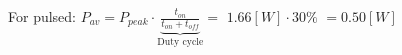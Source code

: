 \documentclass[preview]{standalone}
\begin{document}
\begin{center}
For pulsed: $P_{av} = P_{peak} \cdot \underbrace{\frac{t_{on}}{t_{on}+t_{off}}}_{\text{Duty cycle}}=$ $1.66 [W] \cdot 30 \%$ $= 0.50 [W]$
\end{center}
\end{document}
